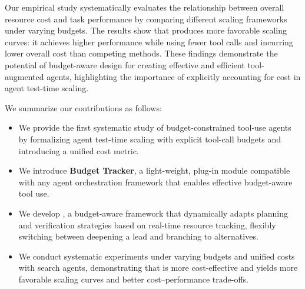 Our empirical study systematically evaluates the relationship between overall resource cost and task performance by comparing different scaling frameworks under varying budgets.
The results show that \method produces more favorable scaling curves: it achieves higher performance while using fewer tool calls and incurring lower overall cost than competing methods.
These findings demonstrate the potential of budget-aware design for creating effective and efficient tool-augmented agents, highlighting the importance of explicitly accounting for cost in agent test-time scaling.


We summarize our contributions as follows:
\begin{itemize}
    \item We provide the first systematic study of budget-constrained tool-use agents by formalizing agent test-time scaling with explicit tool-call budgets and introducing a unified cost metric.
    \item We introduce \textbf{Budget Tracker}, a light-weight, plug-in module compatible with any agent orchestration framework that enables effective budget-aware tool use.
    \item We develop \textbf{\method}, a budget-aware framework that dynamically adapts planning and verification strategies based on real-time resource tracking, flexibly switching between deepening a lead and branching to alternatives.
    \item We conduct systematic experiments under varying budgets and unified costs with search agents, demonstrating that \method is more cost-effective and yields more favorable scaling curves and better cost–performance trade-offs. 
\end{itemize}
